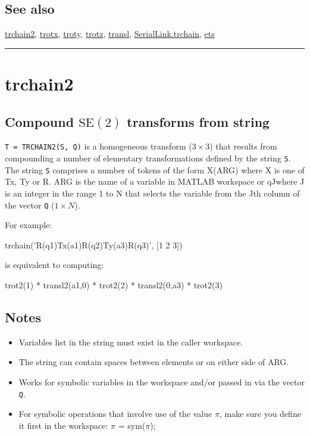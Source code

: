 \subsection*{See also}


\hyperlink{trchain2}{\color{blue} trchain2}, \hyperlink{trotx}{\color{blue} trotx}, \hyperlink{troty}{\color{blue} troty}, \hyperlink{trotz}{\color{blue} trotz}, \hyperlink{transl}{\color{blue} transl}, \hyperlink{SerialLink.trchain}{\color{blue} SerialLink.trchain}, \hyperlink{ets}{\color{blue} ets}

\vspace{1.5ex}\rule{\textwidth}{1mm}

\hypertarget{trchain2}{\section*{trchain2}}
\subsection*{Compound $\mbox{SE}(2)$ transforms from string}


\texttt{T = TRCHAIN2(S, Q)} is a homogeneous transform ($3 \times 3$) that results from
compounding a number of elementary transformations defined by the string
\texttt{S}.  The string \texttt{S} comprises a number of tokens of the form X(ARG) where
X is one of Tx, Ty or R.  ARG is the name of a variable in
MATLAB workspace or \textquotesingle qJ\textquotesingle  where J is an integer in the range 1 to N that
selects the variable from the Jth column of the vector \texttt{Q} ($1 \times N$).



For example:

\begin{Code}
  trchain('R(q1)Tx(a1)R(q2)Ty(a3)R(q3)', [1 2 3])

\end{Code}


is equivalent to computing:

\begin{Code}
  trot2(1) * transl2(a1,0) * trot2(2) * transl2(0,a3) * trot2(3)

\end{Code}

\subsection*{Notes}
\begin{itemize}
  \item Variables list in the string must exist in the caller workspace.
  \item The string can contain spaces between elements or on either side of ARG.
  \item Works for symbolic variables in the workspace and/or passed in via the    vector \texttt{Q}.
  \item For symbolic operations that involve use of the value $\pi$, make sure you    define it first in the workspace: $\pi$ = sym(\textquotesingle $\pi$\textquotesingle );
\end{itemize}

